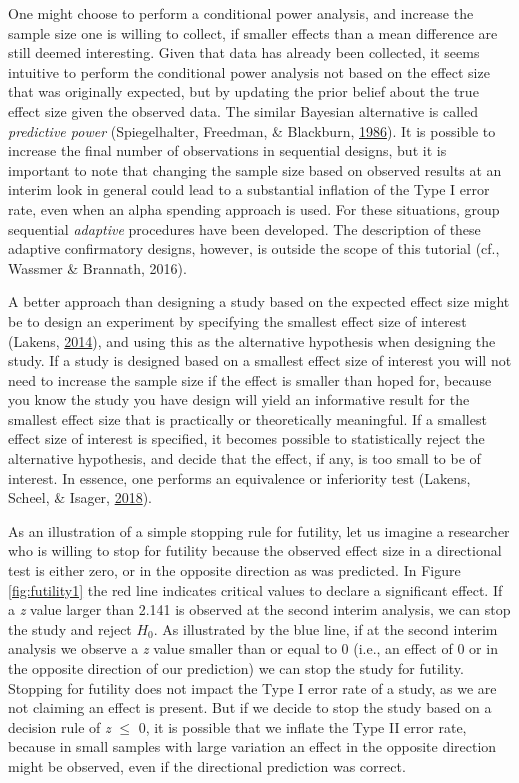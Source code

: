 \documentclass[
  english,
  ,man,floatsintext]{apa6}
\begin{document}
One might choose to perform a conditional power analysis, and increase the sample size one is willing to collect, if smaller effects than a mean difference are still deemed interesting. Given that data has already been collected, it seems intuitive to perform the conditional power analysis not based on the effect size that was originally expected, but by updating the prior belief about the true effect size given the observed data. The similar Bayesian alternative is called \emph{predictive power} (Spiegelhalter, Freedman, \& Blackburn, \protect\hyperlink{ref-spiegelhalter_monitoring_1986}{1986}). It is possible to increase the final number of observations in sequential designs, but it is important to note that changing the sample size based on observed results at an interim look in general could lead to a substantial inflation of the Type I error rate, even when an alpha spending approach is used. For these situations, group sequential \emph{adaptive} procedures have been developed. The description of these adaptive confirmatory designs, however, is outside the scope of this tutorial (cf., Wassmer \& Brannath, 2016).

A better approach than designing a study based on the expected effect size might be to design an experiment by specifying the smallest effect size of interest (Lakens, \protect\hyperlink{ref-lakens_performing_2014}{2014}), and using this as the alternative hypothesis when designing the study. If a study is designed based on a smallest effect size of interest you will not need to increase the sample size if the effect is smaller than hoped for, because you know the study you have design will yield an informative result for the smallest effect size that is practically or theoretically meaningful. If a smallest effect size of interest is specified, it becomes possible to statistically reject the alternative hypothesis, and decide that the effect, if any, is too small to be of interest. In essence, one performs an equivalence or inferiority test (Lakens, Scheel, \& Isager, \protect\hyperlink{ref-lakens_equivalence_2018}{2018}).

As an illustration of a simple stopping rule for futility, let us imagine a researcher who is willing to stop for futility because the observed effect size in a directional test is either zero, or in the opposite direction as was predicted. In Figure \ref{fig:futility1} the red line indicates critical values to declare a significant effect. If a \emph{z} value larger than 2.141 is observed at the second interim analysis, we can stop the study and reject \(H_0\). As illustrated by the blue line, if at the second interim analysis we observe a \emph{z} value smaller than or equal to 0 (i.e., an effect of 0 or in the opposite direction of our prediction) we can stop the study for futility. Stopping for futility does not impact the Type I error rate of a study, as we are not claiming an effect is present. But if we decide to stop the study based on a decision rule of \emph{z} \(\leq\) 0, it is possible that we inflate the Type II error rate, because in small samples with large variation an effect in the opposite direction might be observed, even if the directional prediction was correct.
\end{document}
